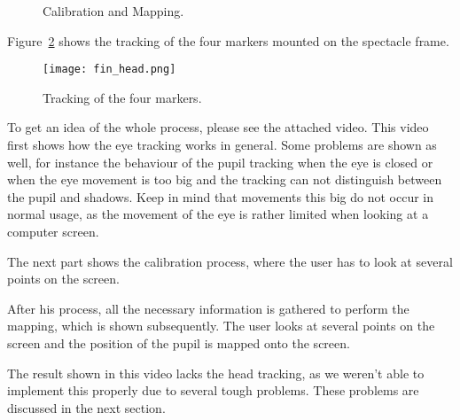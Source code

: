 \begin{figure}[h]
  \centering
  \caption{Calibration and Mapping.}\label{fig:calibrationandmapping}
\end{figure}



Figure~\ref{fig:headmarkers} shows the tracking of the four markers mounted on the spectacle frame.

\begin{figure}[h]
  \centering
  \texttt{[image: fin\_head.png]}
  \caption{Tracking of the four markers.}\label{fig:headmarkers}
\end{figure}

To get an idea of the whole process, please see the attached video. This video first shows how the eye tracking works in general. Some problems are shown as well, for instance the behaviour of the pupil tracking when the eye is closed or when the eye movement is too big and the tracking can not distinguish between the pupil and shadows. Keep in mind that movements this big do not occur in normal usage, as the movement of the eye is rather limited when looking at a computer screen.

The next part shows the calibration process, where the user has to look at several points on the screen.

After his process, all the necessary information is gathered to perform the mapping, which is shown subsequently. The user looks at several points on the screen and the position of the pupil is mapped onto the screen. 

The result shown in this video lacks the head tracking, as we weren't able to implement this properly due to several tough problems. These problems are discussed in the next section.


